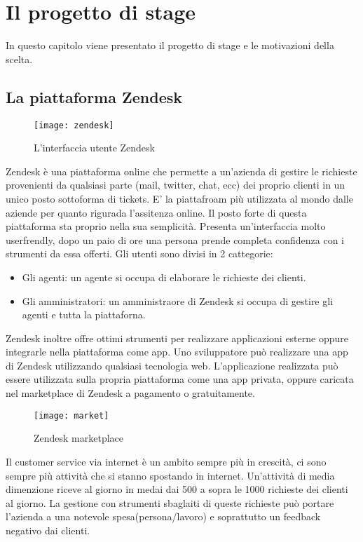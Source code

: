 
\chapter{Il progetto di stage}
In questo capitolo viene presentato il progetto di stage e le motivazioni della scelta.
\section{La piattaforma Zendesk}
\begin{figure}[!h] 
	\centering 
	\texttt{[image: zendesk]} 
	\caption{L'interfaccia utente Zendesk}
\end{figure}
Zendesk è una piattaforma online che permette a un'azienda di gestire le richieste provenienti da qualsiasi parte (mail, twitter, chat, ecc) dei proprio clienti in un unico posto sottoforma di tickets. E' la piattafroam più utilizzata al mondo dalle aziende per quanto rigurada l'assitenza online. Il posto forte di questa piattaforma sta proprio nella sua semplicità. Presenta un'interfaccia molto userfrendly, dopo un paio di ore una persona prende completa confidenza con i strumenti da essa offerti. Gli utenti sono divisi in 2 cattegorie:
	\begin{itemize}
		\item Gli agenti: un agente si occupa di elaborare le richieste dei clienti. 
		\item Gli amministratori: un amministraore di Zendesk si occupa di gestire gli agenti e tutta la piattaforna. 
	\end{itemize}
\newpage
Zendesk inoltre offre ottimi strumenti per realizzare applicazioni esterne oppure integrarle nella piattaforma come app. Uno sviluppatore può realizzare una app di Zendesk utilizzando qualsiasi tecnologia web. L'applicazione realizzata può essere utilizzata sulla propria piattaforma come una app privata, oppure caricata nel marketplace di Zendesk a pagamento o gratuitamente.  
 
\begin{figure}[!h] 
	\centering 
	\texttt{[image: market]} 
	\caption{Zendesk marketplace}
	\end{figure}

Il customer service via internet è un ambito sempre più in crescità, ci sono sempre più attività che si stanno spostando in internet. Un'attività di media dimenzione riceve al giorno in medai dai 500 a sopra le 1000 richieste dei clienti al giorno. La gestione con strumenti sbaglaiti di queste richieste può portare l'azienda a una notevole spesa(persona/lavoro) e soprattutto un feedback negativo dai clienti. 
